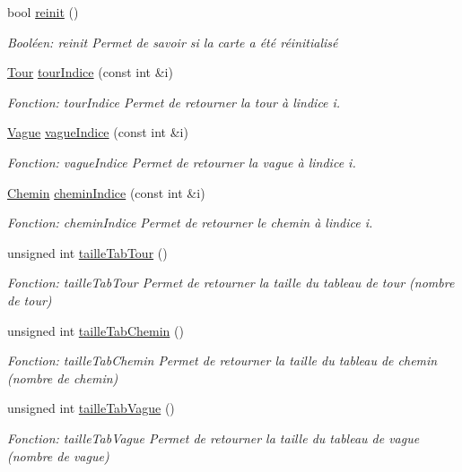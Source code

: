 \begin{DoxyCompactItemize}
bool \hyperlink{classCarte_a80741d7228490a91565f33977355da92}{reinit} ()
\begin{DoxyCompactList}\small\item\em Booléen\+: reinit Permet de savoir si la carte a été réinitialisé \end{DoxyCompactList}\item 
\hyperlink{classTour}{Tour} \hyperlink{classCarte_ae4eaa2ff8488218767a9f68232f066d4}{tour\+Indice} (const int \&i)
\begin{DoxyCompactList}\small\item\em Fonction\+: tour\+Indice Permet de retourner la tour à l\textquotesingle{}indice i. \end{DoxyCompactList}\item 
\hyperlink{classVague}{Vague} \hyperlink{classCarte_a042044f8d54a0f85953a5f61a0d38c86}{vague\+Indice} (const int \&i)
\begin{DoxyCompactList}\small\item\em Fonction\+: vague\+Indice Permet de retourner la vague à l\textquotesingle{}indice i. \end{DoxyCompactList}\item 
\hyperlink{classChemin}{Chemin} \hyperlink{classCarte_aaab8126dc81caed5a8e38772d84b60e4}{chemin\+Indice} (const int \&i)
\begin{DoxyCompactList}\small\item\em Fonction\+: chemin\+Indice Permet de retourner le chemin à l\textquotesingle{}indice i. \end{DoxyCompactList}\item 
unsigned int \hyperlink{classCarte_a34264cb9ab59c19b9bd7ad1eeae324b0}{taille\+Tab\+Tour} ()
\begin{DoxyCompactList}\small\item\em Fonction\+: taille\+Tab\+Tour Permet de retourner la taille du tableau de tour (nombre de tour) \end{DoxyCompactList}\item 
unsigned int \hyperlink{classCarte_aa55a81ad0d51af69b0a34dcc544b678d}{taille\+Tab\+Chemin} ()
\begin{DoxyCompactList}\small\item\em Fonction\+: taille\+Tab\+Chemin Permet de retourner la taille du tableau de chemin (nombre de chemin) \end{DoxyCompactList}\item 
unsigned int \hyperlink{classCarte_a17cf9a92bb7d81cf3279b50bb40b0891}{taille\+Tab\+Vague} ()
\begin{DoxyCompactList}\small\item\em Fonction\+: taille\+Tab\+Vague Permet de retourner la taille du tableau de vague (nombre de vague) \end{DoxyCompactList}\item 

\end{DoxyCompactItemize}
